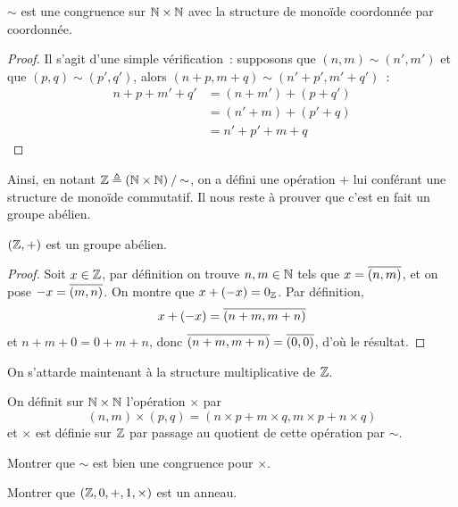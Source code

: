 \begin{proposition}
  $\sim$ est une congruence sur $\mathbb N \times \mathbb N$ avec la structure
  de monoïde coordonnée par coordonnée.
\end{proposition}

\begin{proof}
  Il s'agit d'une simple vérification~: supposons que $(n,m)\sim(n',m')$ et que
  $(p,q)\sim(p',q')$, alors $(n+p,m+q)\sim(n'+p',m'+q')$~:
  \begin{align*}
    n + p + m' + q' &= (n + m') + (p + q')\\
    &= (n' + m) + (p' + q)\\
    &= n' + p' + m + q
  \end{align*}
\end{proof}

Ainsi, en notant $\mathbb Z \triangleq \mathord{(\mathbb N \times \mathbb N)}\mathbin{/}\mathord{\sim}$, on a
défini une opération $+$ lui conférant une structure de monoïde commutatif. Il
nous reste à prouver que c'est en fait un groupe abélien.
\index[notation]{$\bZ$}

\begin{proposition}
  $(\mathbb Z,+)$ est un groupe abélien.
\end{proposition}

\begin{proof}
  Soit $x \in \mathbb Z$, par définition on trouve $n,m\in\mathbb N$ tels que
  $x = \overline{(n,m)}$, et on pose $-x = \overline{(m,n)}$. On montre que
  $x + (-x) = 0_{\mathbb Z}$. Par définition,
  \[x + (-x) = \overline{(n + m, m + n)}\]
  et $n + m + 0 = 0 + m + n$, donc $\overline{(n+m,m+n)}=\overline{(0,0)}$,
  d'où le résultat.
\end{proof}

\noindent
On s'attarde maintenant à la structure multiplicative de $\bZ$.

\begin{definition}
  On définit sur $\mathbb N\times \mathbb N$ l'opération $\times$ par
  \[(n,m)\times(p,q) = (n\times p + m \times q, m \times p + n \times q)\]
  et $\times$ est définie sur $\bZ$ par passage au quotient de cette
  opération par $\sim$.
\end{definition}

\begin{exercise}
  Montrer que $\sim$ est bien une congruence pour $\times$.
\end{exercise}

\begin{exercise}
  Montrer que $(\mathbb Z,0,+,1,\times)$ est un anneau.
\end{exercise}

